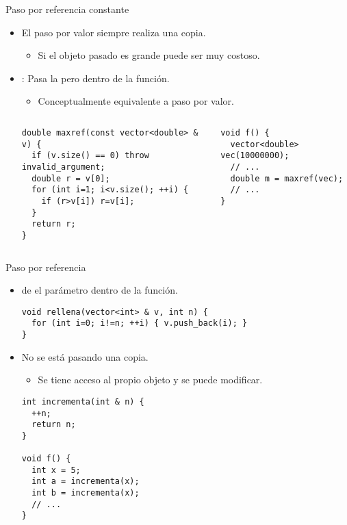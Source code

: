 \begin{frame}[fragile]{Paso por referencia constante}
\begin{itemize}
  \item El paso por valor siempre realiza una copia.
    \begin{itemize}
      \item Si el objeto pasado es grande puede ser muy costoso.
    \end{itemize}
  \item {}: 
        Pasa la  pero 
         dentro de la función.
    \begin{itemize}
      \item Conceptualmente equivalente a paso por valor.
    \end{itemize}
\begin{columns}[T]
\begin{lstlisting}
double maxref(const vector<double> & v) {
  if (v.size() == 0) throw invalid_argument;
  double r = v[0];
  for (int i=1; i<v.size(); ++i) {
    if (r>v[i]) r=v[i];
  }
  return r;
}
\end{lstlisting}

\begin{lstlisting}
void f() {
  vector<double> vec(10000000);
  // ...
  double m = maxref(vec);
  // ...
}
\end{lstlisting}
\end{columns}
\end{itemize}
\end{frame}

\begin{frame}[fragile]{Paso por referencia}
\begin{itemize}
  \item {} de  
        el parámetro dentro de la función.
\begin{lstlisting}
void rellena(vector<int> & v, int n) {
  for (int i=0; i!=n; ++i) { v.push_back(i); }
}
\end{lstlisting}
  \item No se está pasando una copia.
    \begin{itemize}
      \item Se tiene acceso al propio objeto y se puede modificar.
    \end{itemize}
\begin{lstlisting}
int incrementa(int & n) {
  ++n;
  return n;
}

void f() {
  int x = 5;
  int a = incrementa(x);
  int b = incrementa(x);
  // ...
}
\end{lstlisting}
\end{itemize}
\end{frame}

